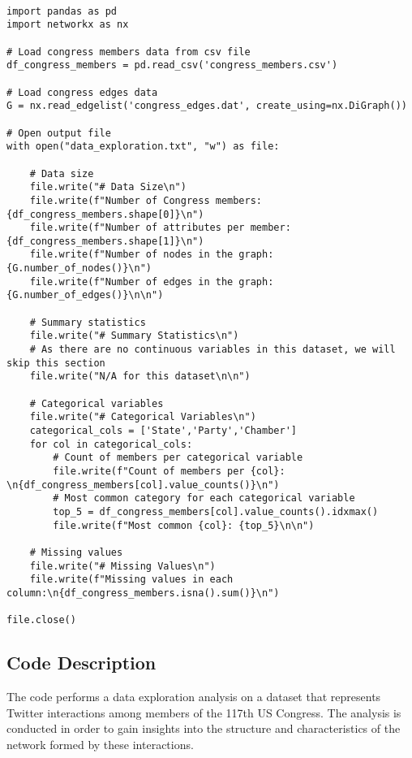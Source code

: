 \documentclass[11pt]{article}
\begin{document}
\begin{verbatim}

import pandas as pd
import networkx as nx

# Load congress members data from csv file 
df_congress_members = pd.read_csv('congress_members.csv')

# Load congress edges data
G = nx.read_edgelist('congress_edges.dat', create_using=nx.DiGraph())

# Open output file
with open("data_exploration.txt", "w") as file:

    # Data size
    file.write("# Data Size\n")
    file.write(f"Number of Congress members: {df_congress_members.shape[0]}\n")
    file.write(f"Number of attributes per member: {df_congress_members.shape[1]}\n")
    file.write(f"Number of nodes in the graph: {G.number_of_nodes()}\n")
    file.write(f"Number of edges in the graph: {G.number_of_edges()}\n\n")
    
    # Summary statistics
    file.write("# Summary Statistics\n")
    # As there are no continuous variables in this dataset, we will skip this section
    file.write("N/A for this dataset\n\n")

    # Categorical variables
    file.write("# Categorical Variables\n")
    categorical_cols = ['State','Party','Chamber']
    for col in categorical_cols:
        # Count of members per categorical variable
        file.write(f"Count of members per {col}: \n{df_congress_members[col].value_counts()}\n")
        # Most common category for each categorical variable
        top_5 = df_congress_members[col].value_counts().idxmax()
        file.write(f"Most common {col}: {top_5}\n\n")

    # Missing values
    file.write("# Missing Values\n")
    file.write(f"Missing values in each column:\n{df_congress_members.isna().sum()}\n")
    
file.close()

\end{verbatim}

\subsection{Code Description}

The code performs a data exploration analysis on a dataset that represents Twitter interactions among members of the 117th US Congress. The analysis is conducted in order to gain insights into the structure and characteristics of the network formed by these interactions.
\end{document}
